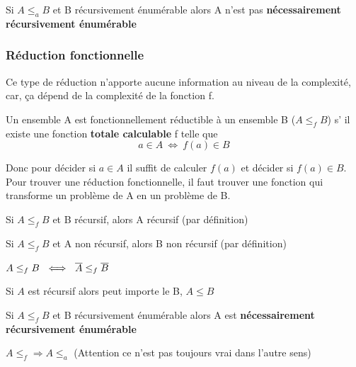 \begin{myprop}
	Si $A \leq_a B$ et B récursivement énumérable alors A n'est pas 
	\textbf{nécessairement récursivement énumérable}
\end{myprop}

\subsubsection{Réduction fonctionnelle}
Ce type de réduction n'apporte aucune information au niveau de la complexité,
car, ça dépend de la complexité de la fonction f.

\begin{mydef}
	Un ensemble A est fonctionnellement réductible à un ensemble B 
	($A\leq_f B$) s’ il existe une fonction \textbf{totale calculable} f 
	telle que 
	\[ a\in A \ \iff \ f(a) \in B \]
\end{mydef}

\begin{myrem}
	Donc pour décider si $a\in A$ il suffit de calculer $f(a)$ et décider si 
	$f(a) \in B$. Pour trouver une réduction fonctionnelle, il faut trouver 
	une fonction qui transforme un problème de A en un problème de B.
\end{myrem}

\begin{myprop}
	Si $A \leq_f B$ et B récursif, alors A récursif (par définition)
\end{myprop}

\begin{myprop}
	Si $A \leq_f B$ et A non récursif, alors B non récursif (par définition)
\end{myprop}

\begin{myprop}
	$A \leq_f B \ \iff \ \overline{A} \leq_f \overline{B}$
\end{myprop}

\begin{myprop}
	Si $A$ est récursif alors peut importe le B, $A \leq B$
\end{myprop}

\begin{myprop}
	Si $A \leq_f B$ et B récursivement énumérable alors A est
	\textbf{nécessairement récursivement énumérable}
\end{myprop}

\begin{myprop}
	$A\leq_f \Rightarrow A\leq_a$ (Attention ce n'est pas toujours vrai 
	dans l'autre sens)
\end{myprop}

